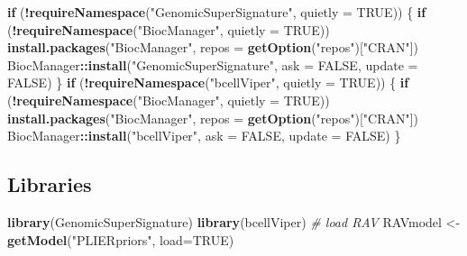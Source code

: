 \documentclass[
]{article}
\newenvironment{Shaded}{\begin{snugshade}}{\end{snugshade}}
\newcommand{\AttributeTok}[1]{\textcolor[rgb]{0.13,0.29,0.53}{#1}}
\newcommand{\CommentTok}[1]{\textcolor[rgb]{0.56,0.35,0.01}{\textit{#1}}}
\newcommand{\ConstantTok}[1]{\textcolor[rgb]{0.56,0.35,0.01}{#1}}
\newcommand{\ControlFlowTok}[1]{\textcolor[rgb]{0.13,0.29,0.53}{\textbf{#1}}}
\newcommand{\FunctionTok}[1]{\textcolor[rgb]{0.13,0.29,0.53}{\textbf{#1}}}
\newcommand{\NormalTok}[1]{#1}
\newcommand{\OtherTok}[1]{\textcolor[rgb]{0.56,0.35,0.01}{#1}}
\newcommand{\SpecialCharTok}[1]{\textcolor[rgb]{0.81,0.36,0.00}{\textbf{#1}}}
\newcommand{\StringTok}[1]{\textcolor[rgb]{0.31,0.60,0.02}{#1}}
\begin{document}
\begin{Shaded}
\begin{Highlighting}[]
\ControlFlowTok{if}\NormalTok{ (}\SpecialCharTok{!}\FunctionTok{requireNamespace}\NormalTok{(}\StringTok{"GenomicSuperSignature"}\NormalTok{, }\AttributeTok{quietly =} \ConstantTok{TRUE}\NormalTok{)) \{}
  \ControlFlowTok{if}\NormalTok{ (}\SpecialCharTok{!}\FunctionTok{requireNamespace}\NormalTok{(}\StringTok{"BiocManager"}\NormalTok{, }\AttributeTok{quietly =} \ConstantTok{TRUE}\NormalTok{)) }\FunctionTok{install.packages}\NormalTok{(}\StringTok{"BiocManager"}\NormalTok{, }\AttributeTok{repos =} \FunctionTok{getOption}\NormalTok{(}\StringTok{"repos"}\NormalTok{)[}\StringTok{"CRAN"}\NormalTok{])}
\NormalTok{  BiocManager}\SpecialCharTok{::}\FunctionTok{install}\NormalTok{(}\StringTok{"GenomicSuperSignature"}\NormalTok{, }\AttributeTok{ask =} \ConstantTok{FALSE}\NormalTok{, }\AttributeTok{update =} \ConstantTok{FALSE}\NormalTok{)}
\NormalTok{\}}
\ControlFlowTok{if}\NormalTok{ (}\SpecialCharTok{!}\FunctionTok{requireNamespace}\NormalTok{(}\StringTok{"bcellViper"}\NormalTok{, }\AttributeTok{quietly =} \ConstantTok{TRUE}\NormalTok{)) \{}
  \ControlFlowTok{if}\NormalTok{ (}\SpecialCharTok{!}\FunctionTok{requireNamespace}\NormalTok{(}\StringTok{"BiocManager"}\NormalTok{, }\AttributeTok{quietly =} \ConstantTok{TRUE}\NormalTok{)) }\FunctionTok{install.packages}\NormalTok{(}\StringTok{"BiocManager"}\NormalTok{, }\AttributeTok{repos =} \FunctionTok{getOption}\NormalTok{(}\StringTok{"repos"}\NormalTok{)[}\StringTok{"CRAN"}\NormalTok{])}
\NormalTok{  BiocManager}\SpecialCharTok{::}\FunctionTok{install}\NormalTok{(}\StringTok{"bcellViper"}\NormalTok{, }\AttributeTok{ask =} \ConstantTok{FALSE}\NormalTok{, }\AttributeTok{update =} \ConstantTok{FALSE}\NormalTok{)}
\NormalTok{\}}
\end{Highlighting}
\end{Shaded}

\subsection{Libraries}\label{libraries}

\begin{Shaded}
\begin{Highlighting}[]
\FunctionTok{library}\NormalTok{(GenomicSuperSignature)}
\FunctionTok{library}\NormalTok{(bcellViper)}
\CommentTok{\# load RAV}
\NormalTok{RAVmodel }\OtherTok{\textless{}{-}} \FunctionTok{getModel}\NormalTok{(}\StringTok{"PLIERpriors"}\NormalTok{, }\AttributeTok{load=}\ConstantTok{TRUE}\NormalTok{)}
\end{Highlighting}
\end{Shaded}
\end{document}
